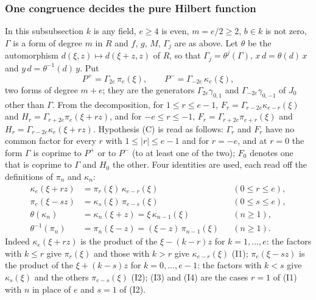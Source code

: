 \documentclass[11pt]{article}
\theoremstyle{definition}
\theoremstyle{remark}
\begin{document}
\subsubsection*{One congruence decides the pure Hilbert function}

In this subsubsection $k$ is any field, $e\ge4$ is even, $m=e/2\ge2$, $b\in k$ is not zero, $\Gamma$ is a form of degree $m$ in $R$ and $f$, $g$, $M$, $\Gamma_j$ are as above. Let $\theta$ be the automorphism $d(\xi,z)\mapsto d(\xi+z,z)$ of $R$, so that $\Gamma_j=\theta^j(\Gamma)$, $x\,d=\theta(d)\,x$ and $y\,d=\theta^{-1}(d)\,y$. Put
\[
P^+=\Gamma_{2e}\,\pi_e(\xi),\qquad P^-=\Gamma_{-2e}\,\kappa_e(\xi),
\]
two forms of degree $m+e$; they are the generators $\Gamma_{2e}\gamma_{0,1}$ and $\Gamma_{-2e}\gamma_{0,-1}$ of $J_0$ other than $\Gamma$. From the decomposition, for $1\le r\le e-1$, $F_r=\Gamma_{r-2e}\kappa_{e-r}(\xi)$ and $H_r=\Gamma_{r+2e}\pi_e(\xi+rz)$, and for $-e\le r\le-1$, $F_r=\Gamma_{r+2e}\pi_{e+r}(\xi)$ and $H_r=\Gamma_{r-2e}\kappa_e(\xi+rz)$. Hypothesis (C) is read as follows: $\Gamma_r$ and $F_r$ have no common factor for every $r$ with $1\le|r|\le e-1$ and for $r=-e$, and at $r=0$ the form $\Gamma$ is coprime to $P^+$ or to $P^-$ (to at least one of the two); $F_0$ denotes one that is coprime to $\Gamma$ and $H_0$ the other. Four identities are used, each read off the definitions of $\pi_n$ and $\kappa_n$:
\begin{align}
\kappa_e(\xi+rz)&=\pi_r(\xi)\,\kappa_{e-r}(\xi)&&(0\le r\le e),\tag{I1}\\
\pi_e(\xi-sz)&=\kappa_s(\xi)\,\pi_{e-s}(\xi)&&(0\le s\le e),\tag{I2}\\
\theta(\kappa_n)&=\kappa_n(\xi+z)=\xi\,\kappa_{n-1}(\xi)&&(n\ge1),\tag{I3}\\
\theta^{-1}(\pi_n)&=\pi_n(\xi-z)=(\xi-z)\,\pi_{n-1}(\xi)&&(n\ge1).\tag{I4}
\end{align}
Indeed $\kappa_e(\xi+rz)$ is the product of the $\xi-(k-r)z$ for $k=1,\dots,e$: the factors with $k\le r$ give $\pi_r(\xi)$ and those with $k>r$ give $\kappa_{e-r}(\xi)$ (I1); $\pi_e(\xi-sz)$ is the product of the $\xi+(k-s)z$ for $k=0,\dots,e-1$: the factors with $k<s$ give $\kappa_s(\xi)$ and the others $\pi_{e-s}(\xi)$ (I2); (I3) and (I4) are the cases $r=1$ of (I1) with $n$ in place of $e$ and $s=1$ of (I2).
\end{document}
